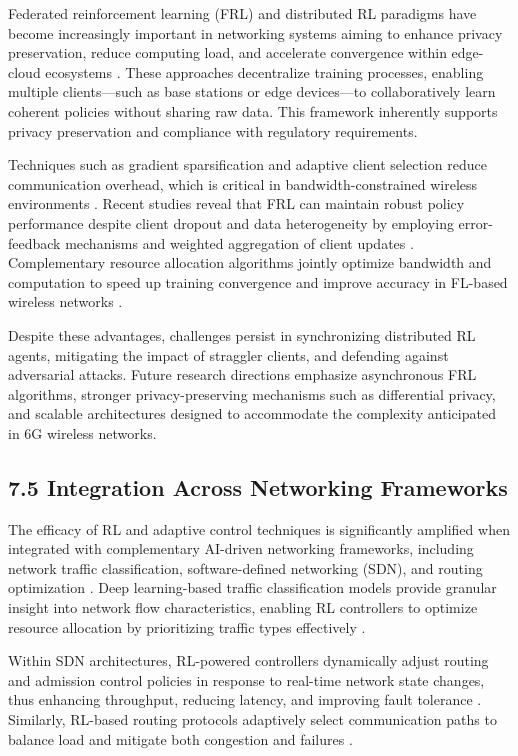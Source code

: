 \documentclass[11pt]{article}
\begin{document}
\begin{itemize}
Federated reinforcement learning (FRL) and distributed RL paradigms have become increasingly important in networking systems aiming to enhance privacy preservation, reduce computing load, and accelerate convergence within edge-cloud ecosystems \cite{ref49, ref50}. These approaches decentralize training processes, enabling multiple clients—such as base stations or edge devices—to collaboratively learn coherent policies without sharing raw data. This framework inherently supports privacy preservation and compliance with regulatory requirements.

Techniques such as gradient sparsification and adaptive client selection reduce communication overhead, which is critical in bandwidth-constrained wireless environments \cite{ref49}. Recent studies reveal that FRL can maintain robust policy performance despite client dropout and data heterogeneity by employing error-feedback mechanisms and weighted aggregation of client updates \cite{ref49}. Complementary resource allocation algorithms jointly optimize bandwidth and computation to speed up training convergence and improve accuracy in FL-based wireless networks \cite{ref50}.

Despite these advantages, challenges persist in synchronizing distributed RL agents, mitigating the impact of straggler clients, and defending against adversarial attacks. Future research directions emphasize asynchronous FRL algorithms, stronger privacy-preserving mechanisms such as differential privacy, and scalable architectures designed to accommodate the complexity anticipated in 6G wireless networks.

\subsection{7.5 Integration Across Networking Frameworks}

The efficacy of RL and adaptive control techniques is significantly amplified when integrated with complementary AI-driven networking frameworks, including network traffic classification, software-defined networking (SDN), and routing optimization \cite{ref51, ref52, ref53}. Deep learning-based traffic classification models provide granular insight into network flow characteristics, enabling RL controllers to optimize resource allocation by prioritizing traffic types effectively \cite{ref51}.

Within SDN architectures, RL-powered controllers dynamically adjust routing and admission control policies in response to real-time network state changes, thus enhancing throughput, reducing latency, and improving fault tolerance \cite{ref52}. Similarly, RL-based routing protocols adaptively select communication paths to balance load and mitigate both congestion and failures \cite{ref53}.


\end{itemize}
\end{document}
